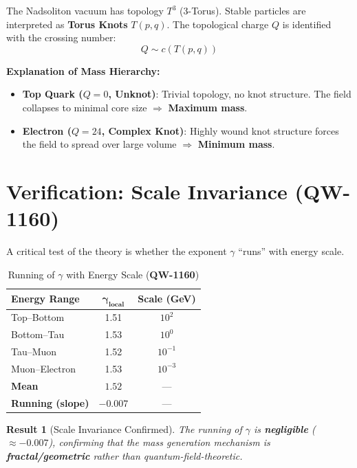 \documentclass[11pt,a4paper]{book}
\newtheorem{result}{Result}[section]
\theoremstyle{remark}
\newcommand{\QW}[1]{\textbf{QW-#1}}
\begin{document}
The Nadsoliton vacuum has topology $T^3$ (3-Torus). Stable particles are interpreted as \textbf{Torus Knots} $T(p,q)$.
The topological charge $Q$ is identified with the crossing number:
\begin{equation}
Q \sim c(T(p,q))
\end{equation}

\textbf{Explanation of Mass Hierarchy:}
\begin{itemize}
    \item \textbf{Top Quark ($Q = 0$, Unknot)}: Trivial topology, no knot structure. The field collapses to minimal core size $\Rightarrow$ \textbf{Maximum mass}.
    \item \textbf{Electron ($Q = 24$, Complex Knot)}: Highly wound knot structure forces the field to spread over large volume $\Rightarrow$ \textbf{Minimum mass}.
\end{itemize}

\section{Verification: Scale Invariance (\QW{1160})}

A critical test of the theory is whether the exponent $\gamma$ ``runs'' with energy scale.

\begin{table}[H]
\centering
\caption{Running of $\gamma$ with Energy Scale (\QW{1160})}
\begin{tabular}{|l|c|c|}
\hline
\textbf{Energy Range} & $\mathbf{\gamma_{local}}$ & \textbf{Scale (GeV)} \\
\hline
Top--Bottom & 1.51 & $10^2$ \\
Bottom--Tau & 1.53 & $10^0$ \\
Tau--Muon & 1.52 & $10^{-1}$ \\
Muon--Electron & 1.53 & $10^{-3}$ \\
\hline
\textbf{Mean} & $\mathbf{1.52}$ & --- \\
\textbf{Running (slope)} & $\mathbf{-0.007}$ & --- \\
\hline
\end{tabular}
\end{table}

\begin{result}[Scale Invariance Confirmed]
The running of $\gamma$ is \textbf{negligible} ($\approx -0.007$), confirming that the mass generation mechanism is \textbf{fractal/geometric} rather than quantum-field-theoretic.
\end{result}
\end{document}
